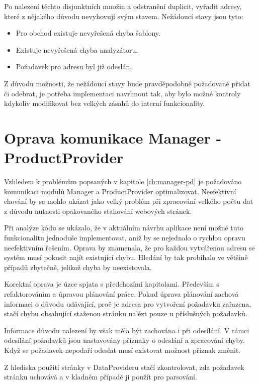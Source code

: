 \documentclass[thesis=B,czech]{FITthesis}[2012/06/26]
\begin{document}
Po nalezení těchto disjunktních množin a odstranění duplicit, vyřadit adresy, které z nějakého důvodu nevyhovují svým stavem.
Nežádoucí stavy jsou tyto:

\begin{itemize}
\item Pro obchod existuje nevyřešená chyba šablony.
\item Existuje nevyřešená chyba analyzátoru.
\item Požadavek pro adresu byl již odeslán.
\end{itemize}

Z důvodu možnosti, že nežádoucí stavy bude pravděpodobně požadované přidat či odebrat, je potřeba implementaci navrhnout tak, aby bylo možné kontroly kdykoliv modifikovat bez velkých zásahů do interní funkcionality.

\section{Oprava komunikace Manager - ProductProvider}
Vzhledem k problémům popsaných v kapitole \ref{ch:manager-pd} je požadováno komunikaci modulů Manager a ProductProvider optimalizovat.
Neefektivní chování by se mohlo ukázat jako velký problém při zpracování velkého počtu dat z důvodu nutnosti opakovaného
stahování webových stránek. 
\par
Při analýze kódu se ukázalo, že v aktuálním návrhu aplikace není možné tuto funkcionalitu jednoduše implementovat, aniž by se nejednalo o rychlou opravu neefektivním řešením. Oprava by znamenala, že pro každou vytvářenou adresu se systém musí pokusit najít
existující chybu. Hledání by tak probíhalo ve většině případů zbytečně, jelikož chyba by neexistovala.
\par
Korektní oprava je úzce spjata s předchozími kapitolami. Především s refaktorováním a úpravou plánování práce. 
Pokud úprava plánování zachová informaci o důvodu udávající, proč je adresa pro vytvoření požadavku zařazena, stačí chybu obsahující staženou stránku nalézt pouze u příslušných požadavků.
\par
Informace důvodu nalezení by však měla být zachována i při odesílání. V rámci odesílání požadavků jsou nastavovány příznaky o odeslání a zpracování chyby. Když se požadavek nepodaří odeslat musí existovat možnost příznak změnit.
\par
Z hlediska použití stránky v DataProvideru stačí zkontrolovat, zda požadavek stránku uchovává a v kladném případě ji použít pro
parsování.
\end{document}
